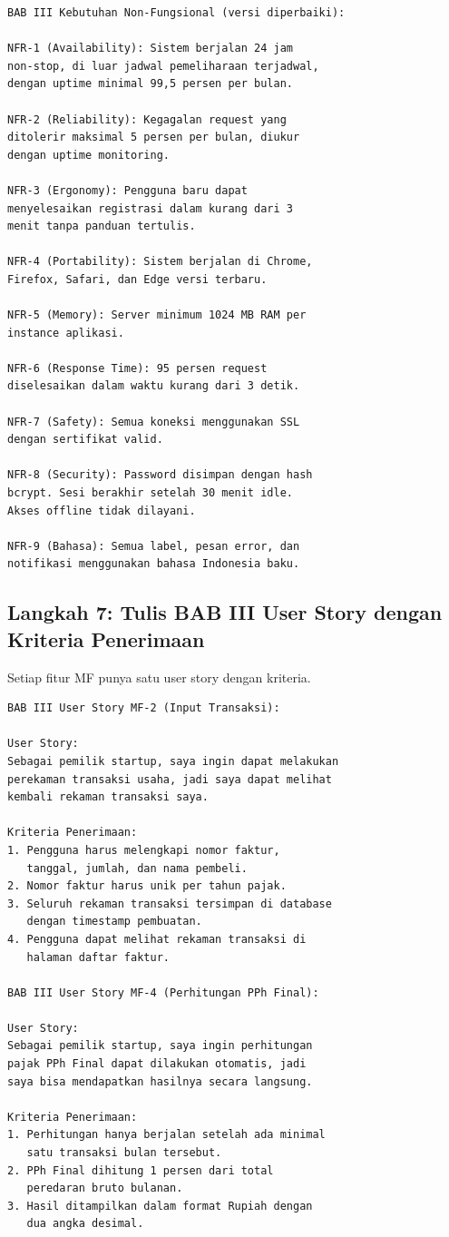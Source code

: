 \documentclass[11pt,a4paper]{article}
\begin{document}
\begin{lstlisting}[style=out]
BAB III Kebutuhan Non-Fungsional (versi diperbaiki):

NFR-1 (Availability): Sistem berjalan 24 jam
non-stop, di luar jadwal pemeliharaan terjadwal,
dengan uptime minimal 99,5 persen per bulan.

NFR-2 (Reliability): Kegagalan request yang
ditolerir maksimal 5 persen per bulan, diukur
dengan uptime monitoring.

NFR-3 (Ergonomy): Pengguna baru dapat
menyelesaikan registrasi dalam kurang dari 3
menit tanpa panduan tertulis.

NFR-4 (Portability): Sistem berjalan di Chrome,
Firefox, Safari, dan Edge versi terbaru.

NFR-5 (Memory): Server minimum 1024 MB RAM per
instance aplikasi.

NFR-6 (Response Time): 95 persen request
diselesaikan dalam waktu kurang dari 3 detik.

NFR-7 (Safety): Semua koneksi menggunakan SSL
dengan sertifikat valid.

NFR-8 (Security): Password disimpan dengan hash
bcrypt. Sesi berakhir setelah 30 menit idle.
Akses offline tidak dilayani.

NFR-9 (Bahasa): Semua label, pesan error, dan
notifikasi menggunakan bahasa Indonesia baku.
\end{lstlisting}

\subsection{Langkah 7: Tulis BAB III User Story dengan Kriteria Penerimaan}

Setiap fitur MF punya satu user story dengan kriteria.

\begin{lstlisting}[style=out]
BAB III User Story MF-2 (Input Transaksi):

User Story:
Sebagai pemilik startup, saya ingin dapat melakukan
perekaman transaksi usaha, jadi saya dapat melihat
kembali rekaman transaksi saya.

Kriteria Penerimaan:
1. Pengguna harus melengkapi nomor faktur,
   tanggal, jumlah, dan nama pembeli.
2. Nomor faktur harus unik per tahun pajak.
3. Seluruh rekaman transaksi tersimpan di database
   dengan timestamp pembuatan.
4. Pengguna dapat melihat rekaman transaksi di
   halaman daftar faktur.

BAB III User Story MF-4 (Perhitungan PPh Final):

User Story:
Sebagai pemilik startup, saya ingin perhitungan
pajak PPh Final dapat dilakukan otomatis, jadi
saya bisa mendapatkan hasilnya secara langsung.

Kriteria Penerimaan:
1. Perhitungan hanya berjalan setelah ada minimal
   satu transaksi bulan tersebut.
2. PPh Final dihitung 1 persen dari total
   peredaran bruto bulanan.
3. Hasil ditampilkan dalam format Rupiah dengan
   dua angka desimal.
\end{lstlisting}
\end{document}
